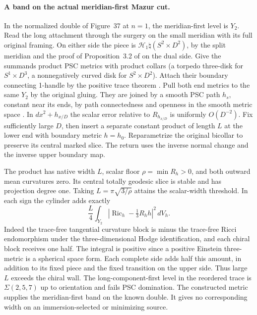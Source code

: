 \documentclass[11pt,letterpaper]{article}
\numberwithin{equation}{section}
\theoremstyle{remark}
\newcommand{\HB}[1]{\mathcal H_{#1}}
\DeclareMathOperator{\Ric}{Ric}
\begin{document}
\paragraph{A band on the actual meridian-first Mazur cut.}
In the normalized double of Figure~37 at \(n=1\), the meridian-first
level is \(Y_2\). Read the long attachment through the surgery on
the small meridian with its full original framing. On either side
the piece is \(\HB{1}\natural(S^2\times D^2)\), by the split
meridian and the proof of Proposition~3.2 of
\cite{GompfScharlemannThompson2010} on the dual side. Give the
summands product PSC metrics with product collars (a torpedo
three-disk for \(S^1\times D^3\), a nonnegatively curved disk
for \(S^2\times D^2\)). Attach their boundary connecting
1-handle by the positive trace theorem
\cite[Definition 4.3 and Theorem 1.2]{Walsh2008Metrics}.
Pull both end metrics to the same \(Y_2\) by the original gluing.
They are joined by a smooth PSC path \(h_s\), constant near its
ends, by path connectedness and openness in the smooth metric space
\cite[Theorem 1.1]{BamlerKleiner2019Contractibility}.
In \(dx^2+h_{x/D}\) the scalar error relative to \(R_{h_{x/D}}\)
is uniformly \(O(D^{-2})\). Fix sufficiently large \(D\), then insert
a separate constant product of length \(L\) at the lower end
with boundary metric \(h=h_0\). Reparametrize the original bicollar
to preserve its central marked slice. The return uses the inverse
normal change and the inverse upper boundary map.

The product has native width \(L\), scalar floor
\(\rho=\min R_h>0\), and both outward mean curvatures zero. Its
central totally geodesic slice is stable and has projection degree
one. Taking \(L=\pi\sqrt{3/\rho}\) attains the scalar-width
threshold. In each sign the cylinder adds exactly
\[
 \frac{L}{4}\int_{Y_2}|\Ric_h-\tfrac13R_hh|^2\,dV_h .
\]
Indeed the trace-free tangential curvature block is minus the
trace-free Ricci endomorphism under the three-dimensional Hodge
identification, and each chiral block receives one half. The
integral is positive since a positive Einstein three-metric is a
spherical space form. Each complete side adds half this amount,
in addition to its fixed piece and the fixed transition on the upper
side. Thus large \(L\) exceeds the chiral wall. The long-component-first
level in the reordered trace is \(\Sigma(2,5,7)\) up to orientation
and fails PSC domination. The constructed metric supplies the
meridian-first band on the known double. It gives no corresponding
width on an immersion-selected or minimizing source.
\end{document}
